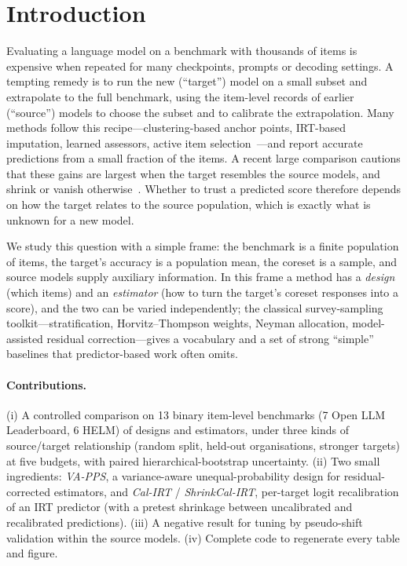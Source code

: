 \section{Introduction}
Evaluating a language model on a benchmark with thousands of items is expensive when repeated for many checkpoints, prompts or decoding settings. A tempting remedy is to run the new (``target'') model on a small subset and extrapolate to the full benchmark, using the item-level records of earlier (``source'') models to choose the subset and to calibrate the extrapolation. Many methods follow this recipe---clustering-based anchor points, IRT-based imputation, learned assessors, active item selection~\citep{vivek2024anchor,polo2024tiny,kipnis2025metabench,pacchiardi2024100,li2025active}---and report accurate predictions from a small fraction of the items. A recent large comparison cautions that these gains are largest when the target resembles the source models, and shrink or vanish otherwise~\citep{zhang2025misses}. Whether to trust a predicted score therefore depends on how the target relates to the source population, which is exactly what is unknown for a new model.

We study this question with a simple frame: the benchmark is a finite population of items, the target's accuracy is a population mean, the coreset is a sample, and source models supply auxiliary information. In this frame a method has a \emph{design} (which items) and an \emph{estimator} (how to turn the target's coreset responses into a score), and the two can be varied independently; the classical survey-sampling toolkit---stratification, Horvitz--Thompson weights, Neyman allocation, model-assisted residual correction---gives a vocabulary and a set of strong ``simple'' baselines that predictor-based work often omits.

\paragraph{Contributions.}
(i) A controlled comparison on 13 binary item-level benchmarks (7 Open LLM Leaderboard, 6 HELM) of designs and estimators, under three kinds of source/target relationship (random split, held-out organisations, stronger targets) at five budgets, with paired hierarchical-bootstrap uncertainty. (ii) Two small ingredients: \emph{VA-PPS}, a variance-aware unequal-probability design for residual-corrected estimators, and \emph{Cal-IRT} / \emph{ShrinkCal-IRT}, per-target logit recalibration of an IRT predictor (with a pretest shrinkage between uncalibrated and recalibrated predictions). (iii) A negative result for tuning by pseudo-shift validation within the source models. (iv) Complete code to regenerate every table and figure.
